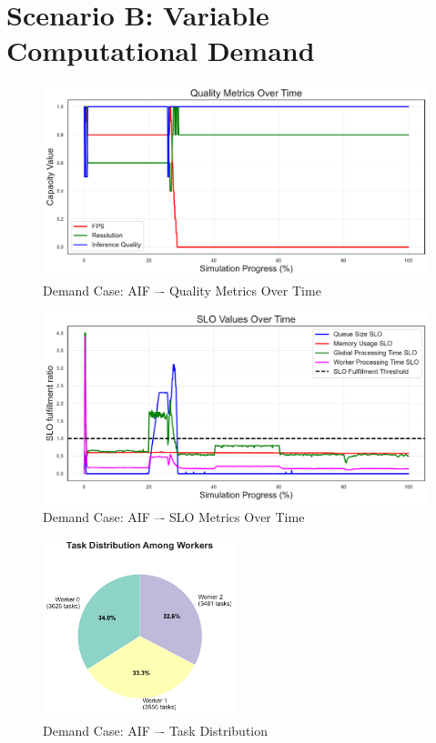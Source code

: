 \clearpage
\section{Scenario B: Variable Computational Demand}




\begin{figure}[h]
    \centering
    \includegraphics[width=\textwidth]{img/results/variable_computational_demand/active_inference_relative_control_quality_metrics.pdf}
    \caption{Demand Case: AIF –- Quality Metrics Over Time}
\end{figure}
\begin{figure}[h]
    \centering
    \includegraphics[width=\textwidth]{img/results/variable_computational_demand/active_inference_relative_control_slo_values.pdf}
    \caption{Demand Case: AIF –- SLO Metrics Over Time}
\end{figure}
\begin{figure}[h]
    \centering
    \includegraphics[width=0.5\textwidth]{img/results/variable_computational_demand/active_inference_relative_control_task_distribution_pie.pdf}
    \caption{Demand Case: AIF –- Task Distribution}
\end{figure}



